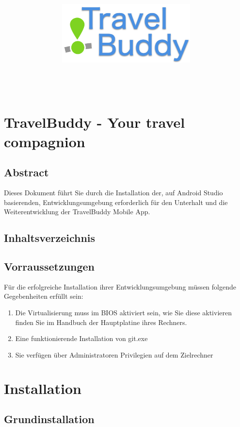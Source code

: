 \documentclass[a4paper,10pt,xetex]{article}
\title{
  \includegraphics[width=7cm]{travel-buddy_white}\\[\bigskipamount]
  \documenttitle\\[\bigskipamount]
}
\author{\documentauthors}
\date{\parbox{\linewidth}{\centering%
  IT15TA ZH \hspace*{3cm} Gruppe 3\endgraf\bigskip
  Dokumentversion \documentversion, \documentdate\endgraf
}}
\begin{document}

\maketitle\newpage

%

\section{TravelBuddy - Your travel compagnion}

\subsection{Abstract}
Dieses Dokument führt Sie durch die Installation der, auf Android Studio basierenden, Entwicklungsumgebung erforderlich für den Unterhalt und die Weiterentwicklung der TravelBuddy Mobile App.

\subsection{Inhaltsverzeichnis}
\subsection{Vorraussetzungen}
Für die erfolgreiche Installation ihrer Entwicklungsumgebung müssen folgende Gegebenheiten erfüllt sein:
\begin{enumerate}
  \item Die Virtualisierung muss im BIOS aktiviert sein, wie Sie diese aktivieren finden Sie im Handbuch der Hauptplatine ihres Rechners.
  \item Eine funktionierende Installation von git.exe
  \item Sie verfügen über Administratoren Privilegien auf dem Zielrechner
\end{enumerate}

\section{Installation}
\subsection{Grundinstallation}
\end{document}
